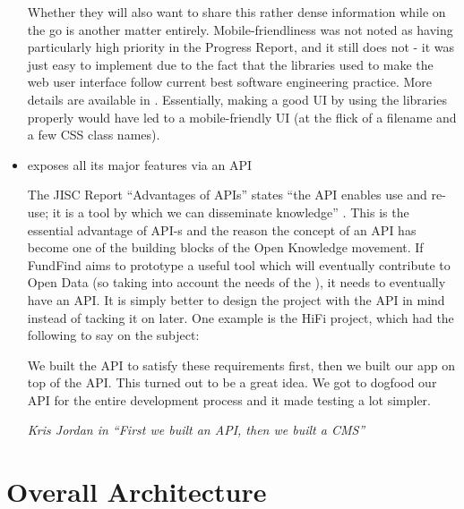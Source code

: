 \begin{itemize}
 Whether they will also want to share this rather dense information while on the go is another matter entirely. Mobile-friendliness was not noted as having particularly high priority in the Progress Report, and it still does not - it was just easy to implement due to the fact that the libraries used to make the web user interface follow current best software engineering practice. More details are available in . Essentially, making a good UI by using the libraries properly would have led to a mobile-friendly UI (at the flick of a filename and a few CSS class names).
 
 \item exposes all its major features via an API
 
 The JISC Report ``Advantages of APIs'' states ``the API enables use and re-use; it is a tool by which we can disseminate knowledge'' \cite{advantages-apis}. This is the essential advantage of API-s and the reason the concept of an API has become one of the building blocks of the Open Knowledge movement. If FundFind aims to prototype a useful tool which will eventually contribute to Open Data (so taking into account the needs of the ), it needs to eventually have an API. It is simply better to design the project with the API in mind instead of tacking it on later. One example is the HiFi project, which had the following to say on the subject:
 
 \begin{shadequote}
  We built the API to satisfy these requirements first, then we built our app on top of the API. This turned out to be a great idea. We got to dogfood our API for the entire development process and it made testing a lot simpler.
  \par\emph{Kris Jordan in ``First we built an API, then we built a CMS'' \cite{hifi-api}}
 \end{shadequote}
 
\end{itemize}

\section{Overall Architecture}

